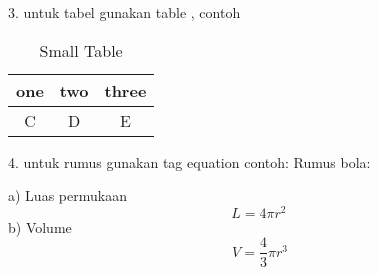 3. untuk tabel gunakan table , contoh

\begin{table}[h]
\caption{Small Table}
\centering
\begin{tabular}{ccc}
\hline
one&two&three\\
\hline
C&D&E\\
\hline
\end{tabular}
\end{table}

4. untuk rumus gunakan tag equation
	contoh:
	Rumus bola:

	a) Luas permukaan
	 \begin{equation}
	     L = 4 \pi r^2 \,
	\end{equation}
	b) Volume
	 \begin{equation}
	     V = \frac{4}{3}\pi r^3
	\end{equation}